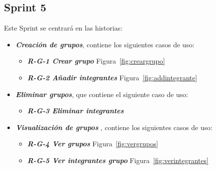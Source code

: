 \subsection{Sprint 5}
Este Sprint se centrará en las historias:

\begin{itemize}
\item \textbf{\textit{Creación de grupos}}, contiene los siguientes casos de uso:
\begin{itemize}
\item\textbf{ \textit{R-G-1 Crear grupo}}  Figura~\ref{fig:creargrupo}
\item\textbf{\textit{ R-G-2 Añadir integrantes}} Figura~\ref{fig:addintegrante}
\end{itemize}
\item \textbf{\textit{Eliminar grupos}}, que contiene el siguiente caso de uso:
\begin{itemize}
\item   \textbf{\textit{R-G-3 Eliminar integrantes}}
\end{itemize}
\item \textbf{\textit{Visualización de grupos}} ,  contiene los siguientes casos de uso:
\begin{itemize}
\item \textbf{\textit{R-G-4 Ver grupos}}  Figura~\ref{fig:vergrupos}

\item  \textbf{\textit{R-G-5 Ver integrantes grupo}} Figura~\ref{fig:verintegrantes}

\end{itemize}
\end{itemize}


 




